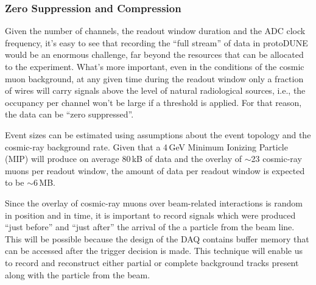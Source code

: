 \subsubsection{Zero Suppression and Compression}
\label{sec:protodune-zs}
Given the number of channels, the readout window duration and the ADC clock frequency, it's easy to see that recording the ``full stream'' of data
in protoDUNE would be an enormous challenge, far beyond the resources that can be allocated to the experiment. What's more important,
even in the conditions of the cosmic muon background, at any given time during the readout window only a fraction of wires will carry signals
above the level of natural radiological sources, i.e., the occupancy per channel won't be large if a threshold is applied. For that reason, the data can be ``zero suppressed''.

Event sizes can be estimated using assumptions about the event topology
and the cosmic-ray background rate.  
Given that a 4\,GeV Minimum Ionizing Particle (MIP) will produce on average 80\,kB of data and the overlay of $\sim$23 cosmic-ray muons per readout window,
the amount of data per readout window is expected to be $\sim$6\,MB. 


Since the overlay of cosmic-ray muons over beam-related interactions is random in position and in time,
it is important to record signals which were produced ``just before'' and ``just after'' 
the arrival of the a particle from the beam line.  
This will be possible because the design of the DAQ contains buffer 
memory that can be accessed after the trigger decision is made.  
This technique will enable us to record and reconstruct either partial or complete background tracks present along with the
particle from the beam.




